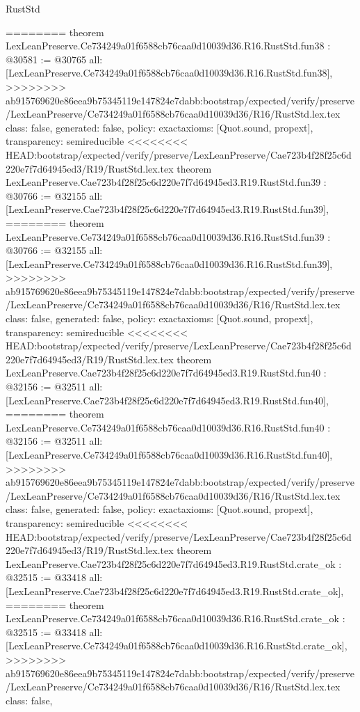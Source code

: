 \begin{lexlean}{RustStd}
\begin{coremodule}
{\begin{coremodule}
{{{{{{{{{{{{{{{{{{{{{{{{{{{{{{{{{{{{{{{{{========
theorem LexLeanPreserve.Ce734249a01f6588cb76caa0d10039d36.R16.RustStd.fun38 : @30581 := @30765 {
  all: [LexLeanPreserve.Ce734249a01f6588cb76caa0d10039d36.R16.RustStd.fun38],
>>>>>>>> ab915769620e86eea9b75345119e147824e7dabb:bootstrap/expected/verify/preserve/LexLeanPreserve/Ce734249a01f6588cb76caa0d10039d36/R16/RustStd.lex.tex
  class: false,
  generated: false,
  policy: exact{axioms: [Quot.sound, propext]},
  transparency: semireducible
}
<<<<<<<< HEAD:bootstrap/expected/verify/preserve/LexLeanPreserve/Cae723b4f28f25c6d220e7f7d64945ed3/R19/RustStd.lex.tex
theorem LexLeanPreserve.Cae723b4f28f25c6d220e7f7d64945ed3.R19.RustStd.fun39 : @30766 := @32155 {
  all: [LexLeanPreserve.Cae723b4f28f25c6d220e7f7d64945ed3.R19.RustStd.fun39],
========
theorem LexLeanPreserve.Ce734249a01f6588cb76caa0d10039d36.R16.RustStd.fun39 : @30766 := @32155 {
  all: [LexLeanPreserve.Ce734249a01f6588cb76caa0d10039d36.R16.RustStd.fun39],
>>>>>>>> ab915769620e86eea9b75345119e147824e7dabb:bootstrap/expected/verify/preserve/LexLeanPreserve/Ce734249a01f6588cb76caa0d10039d36/R16/RustStd.lex.tex
  class: false,
  generated: false,
  policy: exact{axioms: [Quot.sound, propext]},
  transparency: semireducible
}
<<<<<<<< HEAD:bootstrap/expected/verify/preserve/LexLeanPreserve/Cae723b4f28f25c6d220e7f7d64945ed3/R19/RustStd.lex.tex
theorem LexLeanPreserve.Cae723b4f28f25c6d220e7f7d64945ed3.R19.RustStd.fun40 : @32156 := @32511 {
  all: [LexLeanPreserve.Cae723b4f28f25c6d220e7f7d64945ed3.R19.RustStd.fun40],
========
theorem LexLeanPreserve.Ce734249a01f6588cb76caa0d10039d36.R16.RustStd.fun40 : @32156 := @32511 {
  all: [LexLeanPreserve.Ce734249a01f6588cb76caa0d10039d36.R16.RustStd.fun40],
>>>>>>>> ab915769620e86eea9b75345119e147824e7dabb:bootstrap/expected/verify/preserve/LexLeanPreserve/Ce734249a01f6588cb76caa0d10039d36/R16/RustStd.lex.tex
  class: false,
  generated: false,
  policy: exact{axioms: [Quot.sound, propext]},
  transparency: semireducible
}
<<<<<<<< HEAD:bootstrap/expected/verify/preserve/LexLeanPreserve/Cae723b4f28f25c6d220e7f7d64945ed3/R19/RustStd.lex.tex
theorem LexLeanPreserve.Cae723b4f28f25c6d220e7f7d64945ed3.R19.RustStd.crate_ok : @32515 := @33418 {
  all: [LexLeanPreserve.Cae723b4f28f25c6d220e7f7d64945ed3.R19.RustStd.crate_ok],
========
theorem LexLeanPreserve.Ce734249a01f6588cb76caa0d10039d36.R16.RustStd.crate_ok : @32515 := @33418 {
  all: [LexLeanPreserve.Ce734249a01f6588cb76caa0d10039d36.R16.RustStd.crate_ok],
>>>>>>>> ab915769620e86eea9b75345119e147824e7dabb:bootstrap/expected/verify/preserve/LexLeanPreserve/Ce734249a01f6588cb76caa0d10039d36/R16/RustStd.lex.tex
  class: false,
}}}}}}}}}}}}}}}}}}}}}}}}}}}}}}}}}}}}}}}}}}}}}
\end{coremodule}}
\end{coremodule}
\end{lexlean}
